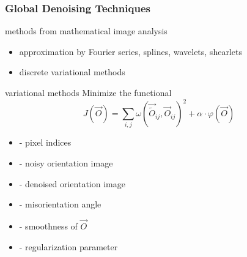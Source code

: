 \documentclass[compress,aspectratio=1610,fleqn]{beamer}
\begin{document}
\begin{frame}
  \frametitle{Global Denoising Techniques}


  \begin{block}{methods from mathematical image analysis}
    \begin{itemize}
    \item approximation by Fourier series, splines, wavelets, shearlets
    \item discrete variational methods
    \end{itemize}
  \end{block}

  \pause

  \begin{block}{variational methods}
    Minimize the functional
    \vspace{0.3cm}
    \begin{equation*}
      J(\vec{O})
      = \sum_{i,j} \omega(\vec{\tilde O}_{ij},\vec{O}_{ij})^{2}
      + \alpha \cdot \varphi(\vec{O})
    \end{equation*}
    \begin{minipage}{0.45\linewidth}
      \begin{itemize}
      \item {} - pixel indices
      \item {} - noisy orientation image
      \item {} - denoised orientation image
    \end{itemize}
    \end{minipage}
    \begin{minipage}{0.45\linewidth}
      \begin{itemize}
      \item {} - misorientation angle
      \item {} - smoothness of
      $\vec{O}$
    \item \structure{$\alpha$} - regularization parameter
    \end{itemize}
    \end{minipage}

  \end{block}

\end{frame}
\end{document}
